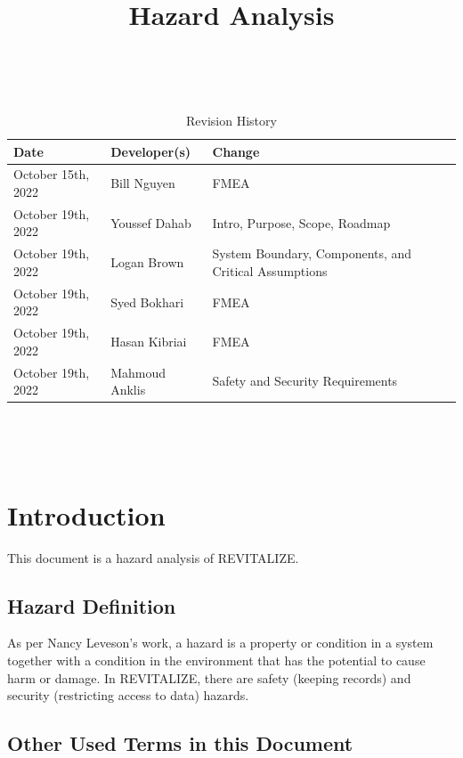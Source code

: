 \documentclass{article}
\title{Hazard Analysis\\\progname}
\author{\authname}
\date{}
\begin{document}
\maketitle
\thispagestyle{empty}

~\newpage


\begin{table}[hp]
	\caption{Revision History} \label{TblRevisionHistory}
	\begin{tabularx}{\textwidth}{llX}
		\toprule
		\textbf{Date} & \textbf{Developer(s)} & \textbf{Change}\\
		\midrule
		October 15th, 2022 & Bill Nguyen & FMEA \\
		October 19th, 2022 & Youssef Dahab & Intro, Purpose, Scope, Roadmap \\
		October 19th, 2022 & Logan Brown & System Boundary, Components, and Critical Assumptions\\
		October 19th, 2022 & Syed Bokhari & FMEA\\
		October 19th, 2022 & Hasan Kibriai & FMEA\\
		October 19th, 2022 & Mahmoud Anklis & Safety and Security Requirements\\
		\bottomrule
	\end{tabularx}
\end{table}

~\newpage

\tableofcontents

~\newpage


\section{Introduction}
This document is a hazard analysis of REVITALIZE.

\subsection{Hazard Definition}
As per Nancy Leveson's work, a hazard is a property or condition in a system together with a condition in the environment that has the potential to cause harm or damage. In REVITALIZE, there are safety (keeping records) and security (restricting access to data) hazards.

\subsection{Other Used Terms in this Document}
\end{document}

